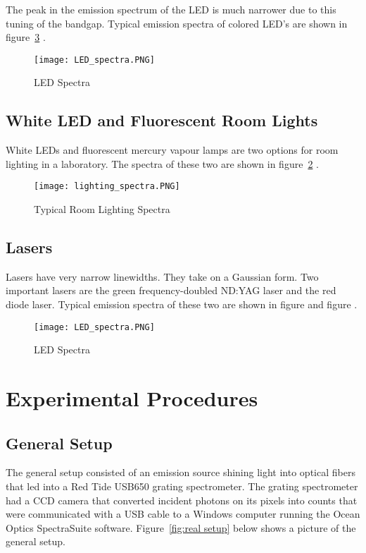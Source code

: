 \documentclass{article}
\begin{document}
The peak in the emission spectrum of the LED is much narrower due to this tuning of the bandgap. Typical emission spectra of colored LED's are shown in figure~\ref{fig:Led spectra} \cite{spectra}.

\begin{figure}[h!]
    \centering
    \texttt{[image: LED\_spectra.PNG]}
    \caption{LED Spectra}
    \label{fig:Led spectra}
\end{figure}
\subsection{White LED and Fluorescent Room Lights}
White LEDs and fluorescent mercury vapour lamps are two options for room lighting in a laboratory. The spectra of these two are shown in figure~\ref{fig:room lighting spectra} \cite{spectra}.

\begin{figure}[h!]
    \centering
    \texttt{[image: lighting\_spectra.PNG]}
    \caption{Typical Room Lighting Spectra}
    \label{fig:room lighting spectra}
\end{figure}

\subsection{Lasers}
Lasers have very narrow linewidths. They take on a Gaussian form. Two important lasers are the green frequency-doubled ND:YAG laser and the red diode laser. Typical emission spectra of these two are shown in figure and figure .

\begin{figure}[h!]
    \centering
    \texttt{[image: LED\_spectra.PNG]}
    \caption{LED Spectra}
    \label{fig:Led spectra}
\end{figure}
\section{Experimental Procedures}
\subsection{General Setup}
The general setup consisted of an emission source shining light into optical fibers that led into a Red Tide USB650 grating spectrometer. The grating spectrometer had a CCD camera that converted incident photons on its pixels into counts that were communicated with a USB cable to a Windows computer running the Ocean Optics SpectraSuite software. Figure~\ref{fig:real setup} below shows a picture of the general setup. 
\end{document}
